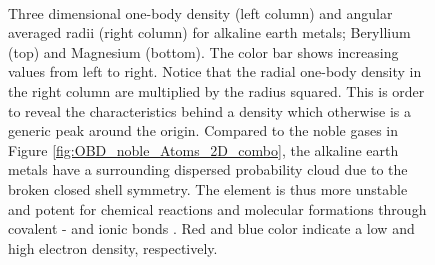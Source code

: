 \begin{figure}
\begin{center}
     \\
  \caption{Three dimensional one-body density (left column) and angular averaged radii (right column) for alkaline earth metals; Beryllium (top) and Magnesium (bottom). The color bar shows increasing values from left to right. Notice that the radial one-body density in the right column are multiplied by the radius squared. This is order to reveal the characteristics behind a density which otherwise is a generic peak around the origin. Compared to the noble gases in Figure \ref{fig:OBD_noble_Atoms_2D_combo}, the alkaline earth metals have a surrounding dispersed probability cloud due to the broken closed shell symmetry. The element is thus more unstable and potent for chemical reactions and molecular formations through covalent - and ionic bonds \cite{UniversityPhysics}. Red and blue color indicate a low and high electron density, respectively.}
  \label{fig:OBD_alkaline_Atoms_2D_combo}
 \end{center}
\end{figure}
 
